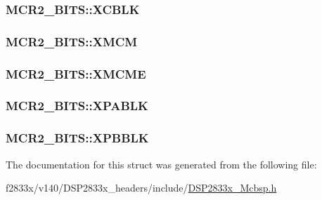 \subsubsection[{X\+C\+B\+L\+K}]{ M\+C\+R2\+\_\+\+B\+I\+T\+S\+::\+X\+C\+B\+L\+K}\label{struct_m_c_r2___b_i_t_s_a0f8891681f320e1aa8f5e857573039da}
\hypertarget{struct_m_c_r2___b_i_t_s_a9e488bb916be1b4489f92b1c5b5c01e2}{}
\subsubsection[{X\+M\+C\+M}]{ M\+C\+R2\+\_\+\+B\+I\+T\+S\+::\+X\+M\+C\+M}\label{struct_m_c_r2___b_i_t_s_a9e488bb916be1b4489f92b1c5b5c01e2}
\hypertarget{struct_m_c_r2___b_i_t_s_a256b1e80f8b87f2b388f9c09e9038740}{}
\subsubsection[{X\+M\+C\+M\+E}]{ M\+C\+R2\+\_\+\+B\+I\+T\+S\+::\+X\+M\+C\+M\+E}\label{struct_m_c_r2___b_i_t_s_a256b1e80f8b87f2b388f9c09e9038740}
\hypertarget{struct_m_c_r2___b_i_t_s_ad9f7c8077d21a97611a5fd446d9e8335}{}
\subsubsection[{X\+P\+A\+B\+L\+K}]{ M\+C\+R2\+\_\+\+B\+I\+T\+S\+::\+X\+P\+A\+B\+L\+K}\label{struct_m_c_r2___b_i_t_s_ad9f7c8077d21a97611a5fd446d9e8335}
\hypertarget{struct_m_c_r2___b_i_t_s_ade3ee95c96b10a67cbf13345a23f3e17}{}
\subsubsection[{X\+P\+B\+B\+L\+K}]{ M\+C\+R2\+\_\+\+B\+I\+T\+S\+::\+X\+P\+B\+B\+L\+K}\label{struct_m_c_r2___b_i_t_s_ade3ee95c96b10a67cbf13345a23f3e17}


The documentation for this struct was generated from the following file\+:\begin{DoxyCompactItemize}
\item 
f2833x/v140/\+D\+S\+P2833x\+\_\+headers/include/\hyperlink{_d_s_p2833x___mcbsp_8h}{D\+S\+P2833x\+\_\+\+Mcbsp.\+h}\end{DoxyCompactItemize}
